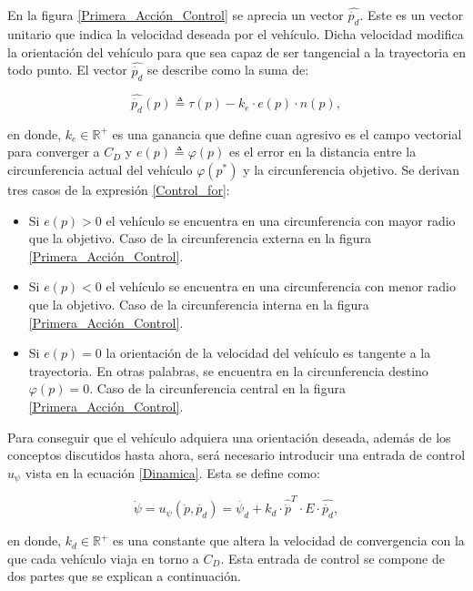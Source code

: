 En la figura \ref{Primera_Acción_Control} se aprecia un vector $\hat{\dot{p_d}}$. Este es un vector unitario que indica la velocidad deseada por el vehículo. Dicha velocidad modifica la orientación del vehículo para que sea capaz de ser tangencial a la trayectoria en todo punto. El vector $\hat{\dot{p_d}}$ se describe como la suma de:

\begin{equation} \label{Control_for}
	\hat{\dot{p_{d}}}\left(p\right)\triangleq\tau\left(p\right)-k_{e}\cdot{e\left(p\right)}\cdot{n\left(p\right)},
\end{equation}

en donde, $k_{e}\in\mathbb{R}^{+}$ es una ganancia que define cuan agresivo es el campo vectorial para converger a $C_D$ y $e\left(p\right)\triangleq\varphi\left(p\right)$ es el error en la distancia entre la circunferencia actual del vehículo $\varphi\left(p^*\right)$ y la circunferencia objetivo. Se derivan tres casos de la expresión \ref{Control_for}:

\begin{itemize}
	\item Si $e\left(p\right)>0$ el vehículo se encuentra en una circunferencia con mayor radio que la objetivo. Caso de la circunferencia externa en la figura \ref{Primera_Acción_Control}.\newpage
	\item Si $e\left(p\right)<0$ el vehículo se encuentra en una circunferencia con menor radio que la objetivo. Caso de la circunferencia interna en la figura \ref{Primera_Acción_Control}.
	\item Si $e\left(p\right)=0$ la orientación de la velocidad del vehículo es tangente a la trayectoria. En otras palabras, se encuentra en la circunferencia destino $\varphi\left(p\right)=0$. Caso de la circunferencia central en la figura \ref{Primera_Acción_Control}.
\end{itemize}

Para conseguir que el vehículo adquiera una orientación deseada, además de los conceptos discutidos hasta ahora, será necesario introducir una entrada de control $u_{\psi}$ vista en la ecuación \ref{Dinamica}. Esta se define como:

\begin{equation} \label{Action_Control}
	\dot{\psi}={u_{\psi}}\left(\dot{p},\dot{p_{d}}\right)=\dot{\psi_{d}}+k_{d}\cdot{\hat{\dot{p}}^{T}}\cdot{E}\cdot{\hat{\dot{p_{d}}}},
\end{equation}

en donde, $k_{d}\in\mathbb{R}^{+}$ es una constante que altera la velocidad de convergencia con la que cada vehículo viaja en torno a $C_D$. Esta entrada de control se compone de dos partes que se explican a continuación.

